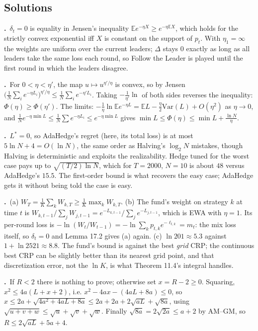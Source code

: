 \documentclass[11pt,a4paper,openany]{book}
\newcommand{\E}{\mathbb{E}}
\newenvironment{solutions}{\small}{}
\newcommand{\sol}[2]{\par\smallskip\noindent\textbf{\sffamily #1.}\ #2\par}
\begin{document}
\subsection*{Solutions}
\begin{solutions}
\sol{17.1}{$\delta_t=0$ is equality in Jensen's inequality $\E e^{-\eta X}\ge e^{-\eta\E X}$, which holds for the strictly convex exponential iff $X$ is constant on the support of $p_t$. With $\eta_1=\infty$ the weights are uniform over the current leaders; $\Delta$ stays $0$ exactly as long as all leaders take the same loss each round, so Follow the Leader is played until the first round in which the leaders disagree.}
\sol{17.2}{For $0<\eta<\eta'$, the map $u\mapsto u^{\eta'/\eta}$ is convex, so by Jensen $\big(\frac1N\sum_ie^{-\eta L_i}\big)^{\eta'/\eta}\le\frac1N\sum_ie^{-\eta'L_i}$. Taking $-\frac1{\eta'}\ln$ of both sides reverses the inequality: $\Phi(\eta)\ge\Phi(\eta')$. The limits: $-\frac1\eta\ln\E e^{-\eta L}=\E L-\frac\eta2\mathrm{Var}(L)+O(\eta^2)$ as $\eta\to0$, and $\frac1N e^{-\eta\min L}\le\frac1N\sum e^{-\eta L_i}\le e^{-\eta\min L}$ gives $\min L\le\Phi(\eta)\le\min L+\frac{\ln N}\eta$.}
\sol{17.3}{$L^*=0$, so AdaHedge's regret (here, its total loss) is at most $5\ln N+4=O(\ln N)$, the same order as Halving's $\log_2N$ mistakes, though Halving is deterministic and exploits the realizability. Hedge tuned for the worst case pays up to $\sqrt{(T/2)\ln N}$, which for $T=2000$, $N=10$ is about $48$ versus AdaHedge's $15.5$. The first-order bound is what recovers the easy case; AdaHedge gets it without being told the case is easy.}
\sol{17.4}{(a) $W_T=\frac1K\sum_kW_{k,T}\ge\frac1K\max_kW_{k,T}$. (b) The fund's weight on strategy $k$ at time $t$ is $W_{k,t-1}/\sum_jW_{j,t-1}=e^{-L_{k,t-1}}/\sum_je^{-L_{j,t-1}}$, which is EWA with $\eta=1$. Its per-round loss is $-\ln(W_t/W_{t-1})=-\ln\sum_kp_{t,k}e^{-\ell_{t,k}}=m_t$: the mix loss itself, so $\delta_t=0$ and Lemma 17.2 gives (a) again. (c) $\ln201\approx5.3$ against $1+\ln2521\approx8.8$. The fund's bound is against the best \emph{grid} CRP; the continuous best CRP can be slightly better than its nearest grid point, and that discretization error, not the $\ln K$, is what Theorem 11.4's integral handles.}
\sol{17.5}{If $R<2$ there is nothing to prove; otherwise set $x=R-2\ge0$. Squaring, $x^2\le4a(L+x+2)$, i.e. $x^2-4ax-(4aL+8a)\le0$, so $x\le2a+\sqrt{4a^2+4aL+8a}\le2a+2a+2\sqrt{aL}+\sqrt{8a}$, using $\sqrt{u+v+w}\le\sqrt u+\sqrt v+\sqrt w$. Finally $\sqrt{8a}=2\sqrt{2a}\le a+2$ by AM–GM, so $R\le2\sqrt{aL}+5a+4$.}
\end{solutions}
\end{document}
